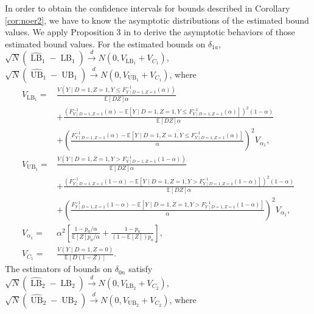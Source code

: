 \documentclass[12pt]{article}
\theoremstyle{plain}
\theoremstyle{definition}
\theoremstyle{remark}
\begin{document}
In order to obtain the confidence intervals for bounds described in Corollary \ref{cor:noer2}, we have to know the asymptotic distributions of the estimated bound values. We apply Proposition 3 in \cite{Lee2009TrainingEffects} to derive the asymptotic behaviors of those estimated bound values. For the estimated bounds on $\delta_{1a}$, $\sqrt{N} (\widehat{\operatorname{LB}}_1 - \operatorname{LB}_1) \stackrel{d}{\rightarrow} N\left(0, V_{\operatorname{LB}_1} + V_{C_1}\right)$, $\sqrt{N} (\widehat{\operatorname{UB}}_1 - \operatorname{UB}_1) \stackrel{d}{\rightarrow} N\left(0, V_{\operatorname{UB}_1} + V_{C_1}\right)$, where
\begin{equation*}
    \begin{aligned}
        V_{\operatorname{LB}_1} =& \frac{V(Y \mid D = 1, Z = 1, Y \leq F^{-1}_{Y \mid D = 1, Z = 1} (\alpha))}{\mathbb{E}[D Z] \alpha} \\
        &+ \frac{(F^{-1}_{Y \mid D = 1, Z = 1}(\alpha) - \mathbb{E}[Y \mid D = 1, Z = 1, Y \leq F^{-1}_{Y \mid D = 1, Z = 1} (\alpha)])^2 (1 - \alpha)}{\mathbb{E}[DZ] \alpha} \\
        &+ \left(\frac{F^{-1}_{Y \mid D = 1, Z = 1} (\alpha) - \mathbb{E}[Y \mid D = 1, Z = 1, Y \leq F^{-1}_{Y \mid D = 1, Z = 1} (\alpha)]}{\alpha}\right)^2 V_{\alpha_1}, \\
        V_{\operatorname{UB}_1} =& \frac{V(Y \mid D = 1, Z = 1, Y > F^{-1}_{Y \mid D = 1, Z = 1} (1 - \alpha))}{\mathbb{E}[D Z] \alpha} \\
        &+ \frac{(F^{-1}_{Y \mid D = 1, Z = 1}(1 - \alpha) - \mathbb{E}[Y \mid D = 1, Z = 1, Y > F^{-1}_{Y \mid D = 1, Z = 1} (1 - \alpha)])^2 (1 - \alpha)}{\mathbb{E}[DZ] \alpha} \\
        &+ \left(\frac{F^{-1}_{Y \mid D = 1, Z = 1} (1 - \alpha) - \mathbb{E}[Y \mid D = 1, Z = 1, Y > F^{-1}_{Y \mid D = 1, Z = 1} (1 - \alpha)]}{\alpha}\right)^2 V_{\alpha_1}, \\
        V_{\alpha_1} =& \alpha^2 \left[\frac{1 - p_a / \alpha}{\mathbb{E}[Z] p_a / \alpha} + \frac{1 - p_a}{(1 - \mathbb{E}[Z]) p_a}\right], \\
        V_{C_1} =& \frac{V(Y \mid D = 1, Z = 0)}{\mathbb{E}[D (1 - Z)]}.
    \end{aligned}
\end{equation*}
The estimators of bounds on $\delta_{0n}$ satisfy $\sqrt{N} (\widehat{\operatorname{LB}}_2 - \operatorname{LB}_2) \stackrel{d}{\rightarrow} N\left(0, V_{\operatorname{LB}_2} + V_{C_2}\right)$, $\sqrt{N} (\widehat{\operatorname{UB}}_2 - \operatorname{UB}_2) \stackrel{d}{\rightarrow} N\left(0, V_{\operatorname{UB}_2} + V_{C_2}\right)$, where 
\end{document}
